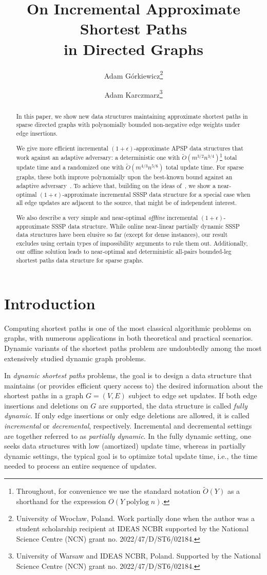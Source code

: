 \documentclass[11pt,letterpaper]{article}
\title{On Incremental Approximate Shortest Paths\\in Directed Graphs}
\date{}
\author{Adam Górkiewicz\thanks{University of Wrocław, Poland. Work partially done when the author was a student scholarship recipient at IDEAS NCBR supported by the National Science Centre (NCN) grant no. 2022/47/D/ST6/02184.} \and
Adam Karczmarz\thanks{University of Warsaw and IDEAS NCBR, Poland. Supported by the National Science Centre (NCN) grant no. 2022/47/D/ST6/02184.}}
\theoremstyle{plain}
\def\polylog{\operatorname{polylog}}
\renewcommand{\O}{O}
\newcommand{\Ot}{\ensuremath{\widetilde{\O}}}
\newcommand{\eps}{\ensuremath{\epsilon}}
\begin{document}
\maketitle

\begin{abstract}
In this paper, we show new data structures maintaining approximate shortest paths in sparse directed graphs with polynomially bounded non-negative edge weights under edge insertions.

  We give more efficient incremental $(1+\eps)$-approximate APSP data structures that work against an adaptive adversary: a deterministic one with $\Ot(m^{3/2}n^{3/4})$\footnote{Throughout, for convenience we use the standard notation $\Ot(Y)$ as a shorthand for the expression $O(Y\polylog{n})$.} total update time and a randomized one with $\Ot(m^{4/3}n^{5/6})$ total update time.
For sparse graphs, these both improve polynomially upon the best-known bound against an adaptive adversary~\cite{KarczmarzL19}.
To achieve that, building on the ideas of~\cite{ChechikZ21,KyngMG22}, we show a near-optimal $(1+\eps)$-approximate incremental SSSP data structure for a special case when all edge updates are adjacent to the source, that might be of independent interest.

We also describe a very simple and near-optimal \emph{offline} incremental $(1+\eps)$-approximate SSSP data structure.
While online near-linear partially dynamic SSSP data structures have been elusive so far (except for dense instances), our result excludes using certain types of impossibility arguments to rule them out.
Additionally, our offline solution leads to near-optimal and deterministic all-pairs bounded-leg shortest paths data structure for sparse graphs.
\end{abstract}


\section{Introduction}
Computing shortest paths is one of the most classical algorithmic problems on graphs, with numerous applications in both theoretical and practical scenarios.
Dynamic variants of the shortest paths problem are undoubtedly among the most extensively studied dynamic graph problems.

In \emph{dynamic shortest paths} problems, the goal is to design a data structure that maintains (or provides efficient query access to) the desired information about the shortest paths in a graph $G=(V,E)$ subject to edge set updates.
If both edge insertions and deletions on $G$ are supported, the data structure is called \emph{fully dynamic}.
If only edge insertions or only edge deletions are allowed, it is called \emph{incremental} or \emph{decremental}, respectively.
Incremental and decremental settings are together referred to as \emph{partially dynamic}.
In the fully dynamic setting, one seeks data structures with low (amortized) update time, whereas in partially dynamic settings, the typical goal is to optimize total update time, i.e., the time needed to process an entire sequence of updates.
\end{document}
